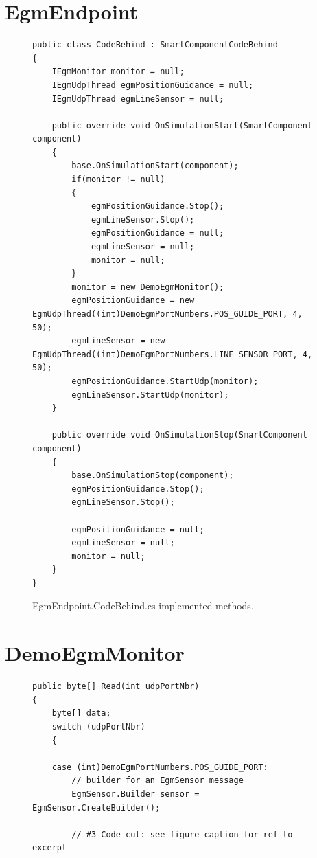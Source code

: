 \documentclass{cslthse-msc}
\begin{document}
\begin{appendices}
\section{EgmEndpoint}
\label{app:Code:EgmEndpoint}
\lstset{language=[Sharp]C}
\begin{figure}[H]
    \centering
    \begin{lstlisting}[fontadjust]
public class CodeBehind : SmartComponentCodeBehind
{
    IEgmMonitor monitor = null;
    IEgmUdpThread egmPositionGuidance = null;
    IEgmUdpThread egmLineSensor = null;

    public override void OnSimulationStart(SmartComponent component)
    {
        base.OnSimulationStart(component);
        if(monitor != null)
        {
            egmPositionGuidance.Stop();
            egmLineSensor.Stop();
            egmPositionGuidance = null;
            egmLineSensor = null;
            monitor = null;
        }
        monitor = new DemoEgmMonitor();
        egmPositionGuidance = new EgmUdpThread((int)DemoEgmPortNumbers.POS_GUIDE_PORT, 4, 50);
        egmLineSensor = new EgmUdpThread((int)DemoEgmPortNumbers.LINE_SENSOR_PORT, 4, 50);
        egmPositionGuidance.StartUdp(monitor);
        egmLineSensor.StartUdp(monitor);
    }

    public override void OnSimulationStop(SmartComponent component)
    {
        base.OnSimulationStop(component);
        egmPositionGuidance.Stop();
        egmLineSensor.Stop();

        egmPositionGuidance = null;
        egmLineSensor = null;
        monitor = null;
    }
}
    \end{lstlisting}
    \caption{EgmEndpoint.CodeBehind.cs implemented methods.}
    \label{fig:EgmEndpointCodeBehind}
\end{figure}

\section{DemoEgmMonitor}
\label{app:Code:DemoEgmMonitor}
\lstset{language=[Sharp]C}
\begin{figure}[H]
\centering
\begin{lstlisting}[fontadjust]
public byte[] Read(int udpPortNbr)
{
    byte[] data;
    switch (udpPortNbr)
    {
    
    case (int)DemoEgmPortNumbers.POS_GUIDE_PORT:
        // builder for an EgmSensor message
        EgmSensor.Builder sensor = EgmSensor.CreateBuilder();
        
        // #3 Code cut: see figure caption for ref to excerpt
        

\end{lstlisting}
\end{figure}
\end{appendices}
\end{document}
